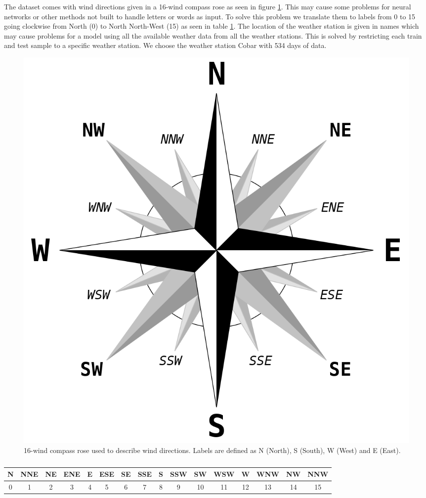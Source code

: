 \documentclass[11pt]{article}
\begin{document}
The dataset comes with wind directions given in a 16-wind compass rose as seen in figure \ref{fig:compass}. This may cause some problems for neural networks or other methods not built to handle letters or words as input. To solve this problem we translate them to labels from 0 to 15 going clockwise from North (0) to North North-West (15) as seen in table \ref{tab:compass}. The location of the weather station is given in names which may cause problems for a model using all the available weather data from all the weather stations. This is solved by restricting each train and test sample to a specific weather station. We choose the weather station Cobar with 534 days of data.
\begin{figure}
    \centering
    \includegraphics[width=.5\textwidth]{../figures/Brosen_windrose.png}
    \caption{16-wind compass rose used to describe wind directions. Labels are defined as N (North), S (South), W (West) and E (East).}
    \label{fig:compass}
\end{figure}
\begin{table}[H]
    \begin{small}
        \caption{}
        \label{tab:compass}
        \begin{center}
            \begin{tabular}{|c|c|c|c|c|c|c|c|c|c|c|c|c|c|c|c|}
                \hline
                N & NNE & NE & ENE & E & ESE & SE & SSE & S & SSW & SW & WSW & W  & WNW & NW & NNW \\
                \hline
                0 & 1   & 2  & 3   & 4 & 5   & 6  & 7   & 8 & 9   & 10 & 11  & 12 & 13  & 14 & 15  \\
                \hline
            \end{tabular}
        \end{center}
    \end{small}
\end{table}
\end{document}
